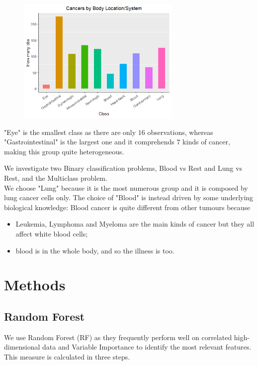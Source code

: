 \documentclass[a4paper,11pt, oneside]{article}  %
\begin{document}
\begin{figure}
	\includegraphics[width=0.7\textwidth]{plot1.png}
	\label{fig1}
\end{figure}
"Eye" is the smallest class as there are only $16$ observations, whereas "Gastrointestinal" is the largest one and it comprehends $7$ kinds of cancer,  making this group quite heterogeneous. 

We investigate two Binary classification problems,  Blood vs Rest and Lung vs Rest, and the Multiclass problem. \\
We choose "Lung" because it is the most numerous group and it is composed by lung cancer cells only.  The choice of "Blood" is instead driven by some underlying biological knowledge: Blood cancer is quite different from other tumours because
\begin{itemize}
	\item Leukemia, Lymphoma and Myeloma are the main kinds of cancer but they all affect white blood cells;
	\item blood is in the whole body, and so the illness is too.
\end{itemize} 

\section{Methods}
\subsection{Random Forest}
We use Random Forest (RF) as they frequently perform well on correlated high-dimensional data and Variable Importance to identify the most relevant features. This measure is calculated in three steps.  
\end{document}
